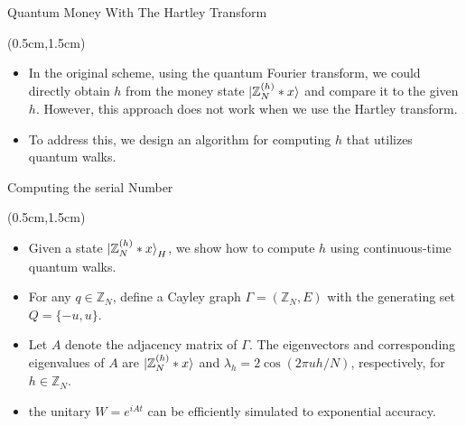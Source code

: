 \documentclass{beamer}
\theoremstyle{definition}
\begin{document}
\begin{frame}{Quantum Money With The Hartley Transform}
    
    \begin{textblock*}{12cm}(0.5cm,1.5cm)
        \begin{itemize}
            \item  In the original scheme, using the quantum Fourier transform, we could directly obtain $h$ from the money state $\ket{\mathbb{Z}_N^{(h)} * x}$ and compare it to the given $h$. However, this approach does not work when we use the Hartley transform. 
            \vspace{1cm}
            \item  To address this, we design an algorithm for computing $h$ that utilizes quantum walks. 

        \end{itemize}
        
        
       
        
    \end{textblock*}


\end{frame}





\begin{frame}{Computing the serial Number}

    \begin{textblock*}{12cm}(0.5cm,1.5cm)

        \begin{itemize}
            \item Given a state $\ket{\mathbb{Z}_N^{(h)} * x}_H$, we show how to compute $h$ using continuous-time quantum walks.
            \vspace{0.5cm}
            \item For any $q \in \mathbb{Z}_N$, define a Cayley graph $\Gamma = (\mathbb{Z}_N, E)$ with the generating set $Q = \{-u, u\}$.
            \vspace{0.5cm}
            \item Let $A$ denote the adjacency matrix of $\Gamma$. The eigenvectors and corresponding eigenvalues of $A$ are $\ket{\mathbb{Z}_N^{(h)} * x}$ and $\lambda_h = 2\cos(2\pi uh / N)$, respectively, for $h \in \mathbb{Z}_N$.
            \vspace{0.5cm}
            \item the unitary $W = e^{iAt}$ can be efficiently simulated to exponential accuracy.
        \end{itemize}


    \end{textblock*}

 \end{frame}
\end{document}
